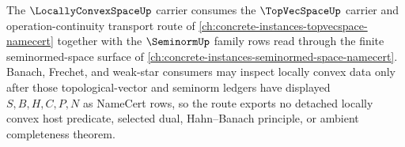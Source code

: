 The $\LocallyConvexSpaceUp$ carrier consumes the $\TopVecSpaceUp$ carrier and operation-continuity transport route of \autoref{ch:concrete-instances-topvecspace-namecert} together with the $\SeminormUp$ family rows read through the finite seminormed-space surface of \autoref{ch:concrete-instances-seminormed-space-namecert}. Banach, Frechet, and weak-star consumers may inspect locally convex data only after those topological-vector and seminorm ledgers have displayed $S,B,H,C,P,N$ as NameCert rows, so the route exports no detached locally convex host predicate, selected dual, Hahn--Banach principle, or ambient completeness theorem.
